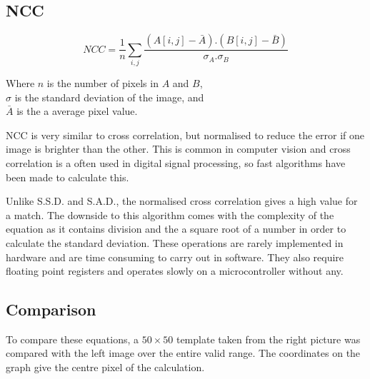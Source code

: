 \subsection{NCC}\label{Section:NCC}
\begin{equation}\label{eq:NCC}
NCC =  \frac{1}{n}\sum\limits_{i,j} \frac{(A[i,j] - \bar{A}).(B[i,j] - \bar{B})}{\sigma _A . \sigma _B}
\end{equation}
\begin{center}
Where $n$ is the number of pixels in $A$ and $B$, \\$\sigma$ is the standard deviation of the image, and \\$\bar{A}$ is the a average pixel value. 
\end{center}
NCC is very similar to cross correlation, but normalised to reduce the error if one image is brighter than the other. This is common in computer vision \citep{Tsai:NCC} and cross correlation is a often used in digital signal processing, so fast algorithms have been made to calculate this. 

Unlike S.S.D. and S.A.D., the normalised cross correlation gives a high value for a match. The downside to this algorithm comes with the complexity of the equation as it contains division and the a square root of a number in order to calculate the standard deviation. These operations are rarely implemented in hardware and are time consuming to carry out in software. They also require floating point registers and operates slowly on a microcontroller without any. 



\subsection{Comparison}

To compare these equations, a $50 \times 50$ template taken from the right picture was compared with the left image over the entire valid range. The coordinates on the graph give the centre pixel of the calculation. 

